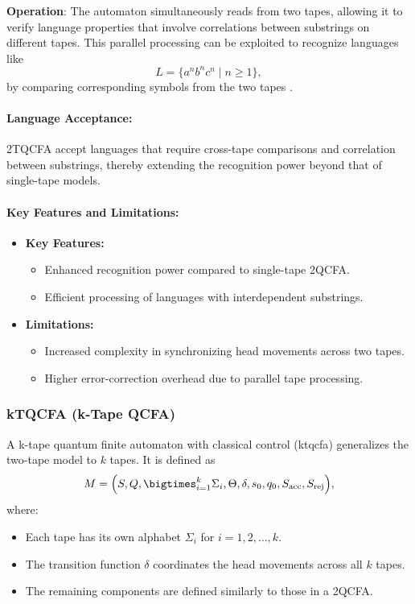 \textbf{Operation}:  
The automaton simultaneously reads from two tapes, allowing it to verify language properties that involve correlations between substrings on different tapes. This parallel processing can be exploited to recognize languages like 
\[
L = \{a^n b^n c^n \mid n \geq 1\},
\]
by comparing corresponding symbols from the two tapes \cite{zheng2012two}.

\paragraph{Language Acceptance:}  
2TQCFA accept languages that require cross-tape comparisons and correlation between substrings, thereby extending the recognition power beyond that of single-tape models.

\paragraph{Key Features and Limitations:}
\begin{itemize}
    \item \textbf{Key Features:}
    \begin{itemize}
        \item Enhanced recognition power compared to single-tape 2QCFA.
        \item Efficient processing of languages with interdependent substrings.
    \end{itemize}
    \item \textbf{Limitations:}
    \begin{itemize}
        \item Increased complexity in synchronizing head movements across two tapes.
        \item Higher error-correction overhead due to parallel tape processing.
    \end{itemize}
\end{itemize}

\subsubsection{kTQCFA (k-Tape QCFA)}
\label{sssec:ktqcfa}
\begin{definition}[kTQCFA]
A k-tape quantum finite automaton with classical control (\gls{ktqcfa}) generalizes the two-tape model to \( k \) tapes. It is defined as 
\[
M = \Bigl(S, Q, \bigtimes_{i=1}^{k} \Sigma_i, \Theta, \delta, s_0, q_0, S_{\text{acc}}, S_{\text{rej}}\Bigr),
\]
where:
\begin{itemize}
    \item Each tape has its own alphabet \( \Sigma_i \) for \( i = 1, 2, \ldots, k \).
    \item The transition function \(\delta\) coordinates the head movements across all \( k \) tapes.
    \item The remaining components are defined similarly to those in a 2QCFA.
\end{itemize}
\end{definition}

